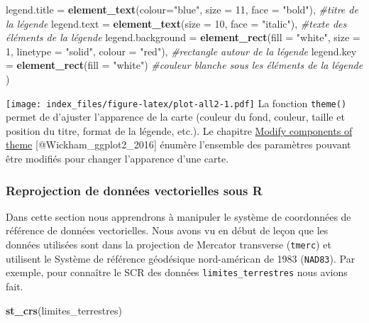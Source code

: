 \documentclass[]{article}
\newenvironment{Shaded}{\begin{snugshade}}{\end{snugshade}}
\newcommand{\KeywordTok}[1]{\textcolor[rgb]{0.13,0.29,0.53}{\textbf{#1}}}
\newcommand{\DataTypeTok}[1]{\textcolor[rgb]{0.13,0.29,0.53}{#1}}
\newcommand{\DecValTok}[1]{\textcolor[rgb]{0.00,0.00,0.81}{#1}}
\newcommand{\StringTok}[1]{\textcolor[rgb]{0.31,0.60,0.02}{#1}}
\newcommand{\CommentTok}[1]{\textcolor[rgb]{0.56,0.35,0.01}{\textit{#1}}}
\newcommand{\NormalTok}[1]{#1}
\begin{document}
\begin{Shaded}
\begin{Highlighting}[]
      \DataTypeTok{legend.title =} \KeywordTok{element_text}\NormalTok{(}\DataTypeTok{colour=}\StringTok{"blue"}\NormalTok{, }\DataTypeTok{size =} \DecValTok{11}\NormalTok{, }\DataTypeTok{face =} \StringTok{"bold"}\NormalTok{), }\CommentTok{#titre de la légende}
      \DataTypeTok{legend.text =} \KeywordTok{element_text}\NormalTok{(}\DataTypeTok{size =} \DecValTok{10}\NormalTok{, }\DataTypeTok{face =} \StringTok{"italic"}\NormalTok{),               }\CommentTok{#texte des éléments de la légende}
      \DataTypeTok{legend.background =} \KeywordTok{element_rect}\NormalTok{(}\DataTypeTok{fill =} \StringTok{"white"}\NormalTok{, }\DataTypeTok{size =} \DecValTok{1}\NormalTok{, }\DataTypeTok{linetype =} \StringTok{"solid"}\NormalTok{, }\DataTypeTok{colour =} \StringTok{"red"}\NormalTok{), }\CommentTok{#rectangle autour de la légende}
      \DataTypeTok{legend.key =} \KeywordTok{element_rect}\NormalTok{(}\DataTypeTok{fill =} \StringTok{"white"}\NormalTok{)        }\CommentTok{#couleur blanche sous les éléments de la légende}
\NormalTok{)}
\end{Highlighting}
\end{Shaded}

\texttt{[image: index\_files/figure-latex/plot-all2-1.pdf]} La fonction
\texttt{theme()} permet de d'ajuster l'apparence de la carte (couleur du
fond, couleur, taille et position du titre, format de la légende, etc.).
Le chapitre
\href{https://ggplot2.tidyverse.org/reference/theme.html}{Modify
components of theme} {[}@Wickham\_ggplot2\_2016{]} énumère l'ensemble
des paramètres pouvant être modifiés pour changer l'apparence d'une
carte.

\subsubsection{Reprojection de données vectorielles sous
R}\label{reprojection-de-donnuxe9es-vectorielles-sous-r}

Dans cette section nous apprendrons à manipuler le système de
coordonnées de référence de données vectorielles. Nous avons vu en début
de leçon que les données utilisées sont dans la projection de Mercator
transverse (\texttt{tmerc}) et utilisent le Système de référence
géodésique nord-américan de 1983 (\texttt{NAD83}). Par exemple, pour
connaître le SCR des données \texttt{limites\_terrestres} nous avions
fait.

\begin{Shaded}
\begin{Highlighting}[]
\KeywordTok{st_crs}\NormalTok{(limites_terrestres)}
\end{Highlighting}
\end{Shaded}
\end{document}
